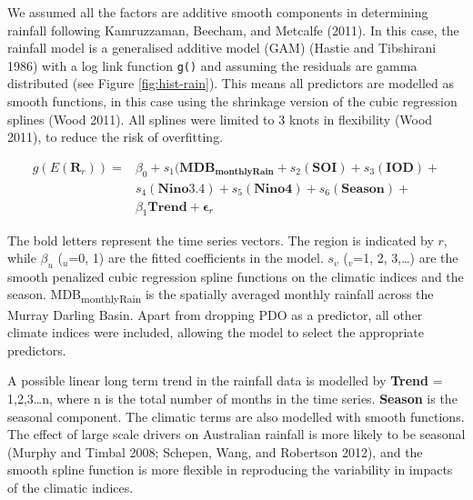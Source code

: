\documentclass[fleqn,10pt,lineno]{wlpeerj} %
\begin{document}
We assumed all the factors are additive smooth components in determining
rainfall following Kamruzzaman, Beecham, and Metcalfe (2011). In this
case, the rainfall model is a generalised additive model (GAM) (Hastie
and Tibshirani 1986) with a log link function \texttt{g()} and assuming
the residuals are gamma distributed (see Figure \ref{fig:hist-rain}).
This means all predictors are modelled as smooth functions, in this case
using the shrinkage version of the cubic regression splines (Wood 2011).
All splines were limited to 3 knots in flexibility (Wood 2011), to
reduce the risk of overfitting. \vspace{0.5cm}

\begin{equation}
\begin{array}{lll}
g(E(\mathbf{R}_r)) = &\beta_0 + s_1(\mathbf{MDB_{monthlyRain}} + s_2(\mathbf{SOI}) + s_3(\mathbf{IOD}) + \\
&s_4(\mathbf{Nino3.4}) + s_5(\mathbf{Nino4}) + s_6(\mathbf{Season}) + \\
           &\beta_1\mathbf{Trend} + \boldsymbol{\epsilon}_r
\end{array}
\label{eq:model}
\end{equation}

The bold letters represent the time series vectors. The region is
indicated by \(r\), while \(\beta_u\) (\(_u\)=0, 1) are the fitted
coefficients in the model. \(s_v\) (\(_v\)=1, 2, 3,\ldots{}) are the
smooth penalized cubic regression spline functions on the climatic
indices and the season. MDB\textsubscript{monthlyRain} is the spatially
averaged monthly rainfall across the Murray Darling Basin. Apart from
dropping PDO as a predictor, all other climate indices were included,
allowing the model to select the appropriate predictors.

A possible linear long term trend in the rainfall data is modelled by
\textbf{Trend} = 1,2,3\ldots{}n, where n is the total number of months
in the time series. \textbf{Season} is the seasonal component. The
climatic terms are also modelled with smooth functions. The effect of
large scale drivers on Australian rainfall is more likely to be seasonal
(Murphy and Timbal 2008; Schepen, Wang, and Robertson 2012), and the
smooth spline function is more flexible in reproducing the variability
in impacts of the climatic indices.
\end{document}
